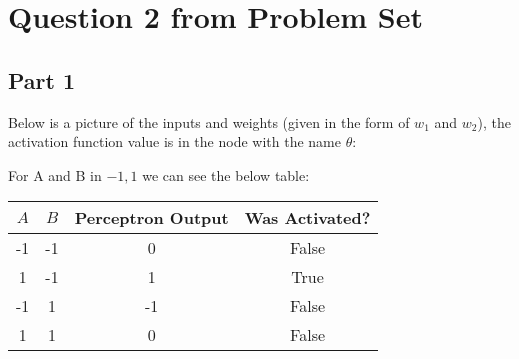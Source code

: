 \documentclass{article}
\begin{document}
    \section{Question 2 from Problem Set}
    \subsection{Part 1}
    Below is a picture of the inputs and weights (given in the form of $w_1$ and $w_2$), the activation function value is in the
    node with the name $\theta$:
    \linebreak
    \linebreak
    \linebreak
    \linebreak
    For A and B in ${-1, 1}$ we can see the below table:
    \linebreak
    \linebreak
    \begin{tabular}{c c c c}
        $A$ & $B$ & Perceptron Output & Was Activated? \\
        \hline
        -1 & -1 & 0 & False \\
        1 & -1 & 1 & True \\
        -1 & 1 & -1 & False \\
        1 & 1 & 0 & False
    \end{tabular}
\end{document}

